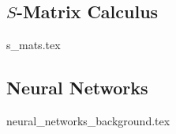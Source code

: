 \subsection{$S$-Matrix Calculus} \label{sec:s_mats}
{s_mats.tex}
\clearpage

\subsection{Neural Networks} \label{sec:NN_bg}
{neural_networks_background.tex}
